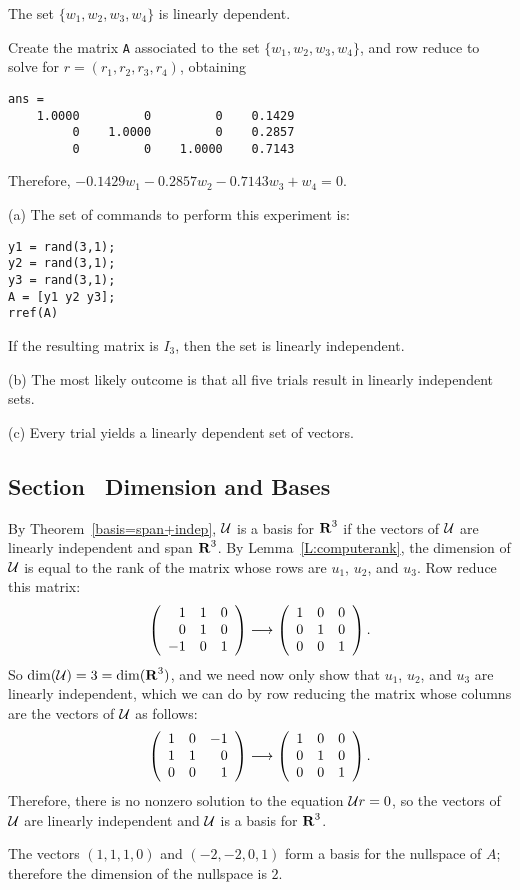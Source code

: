  \ans The set $\{w_1,w_2,w_3,w_4\}$ is linearly dependent.

\soln Create the matrix {\tt A} associated to the set
$\{w_1,w_2,w_3,w_4\}$, and row reduce to solve for
$r = (r_1,r_2,r_3,r_4)$, obtaining
\begin{verbatim}
ans =
    1.0000         0         0    0.1429
         0    1.0000         0    0.2857
         0         0    1.0000    0.7143
\end{verbatim}
Therefore, $-0.1429w_1 - 0.2857w_2 - 0.7143w_3 + w_4 = 0$.

(a) The set of commands to perform this experiment is:
\begin{verbatim}
y1 = rand(3,1);
y2 = rand(3,1);
y3 = rand(3,1);
A = [y1 y2 y3];
rref(A)
\end{verbatim}
If the resulting matrix is $I_3$, then the set is linearly
independent.

(b) The most likely outcome is that all five trials result in
linearly independent sets.

(c) Every trial yields a linearly dependent set of vectors.



\subsection*{Section~\protect{\ref{S:5.5}} Dimension and Bases}

By Theorem~\ref{basis=span+indep},
${\cal U}$ is a basis for $\mbox{$\bf{R}$}^3$ if the vectors of ${\cal U}$ are
linearly independent and span $\mbox{$\bf{R}$}^3$.  By Lemma~\ref{L:computerank},
the dimension of ${\cal U}$ is equal to the rank of the matrix whose
rows are $u_1$, $u_2$, and $u_3$.  Row reduce this matrix:
\[
\left(\begin{array}{rrr} 1 & 1 & 0 \\ 0 & 1 & 0 \\ -1 & 0 & 1\end{array}\right) \longrightarrow
\left(\begin{array}{rrr} 1 & 0 & 0 \\ 0 & 1 & 0 \\ 0 & 0 & 1\end{array}\right).
\]
So $\dim({\cal U}) = 3 = \dim(\mbox{$\bf{R}$}^3)$, and we need now only show that
$u_1$, $u_2$, and $u_3$ are linearly independent, which we can do by
row reducing the matrix whose columns are the vectors of ${\cal U}$ as
follows:
\[
\left(\begin{array}{rrr} 1 & 0 & -1 \\ 1 & 1 & 0 \\ 0 & 0 & 1\end{array}\right) \longrightarrow
\left(\begin{array}{rrr} 1 & 0 & 0 \\ 0 & 1 & 0 \\ 0 & 0 & 1\end{array}\right).
\]
Therefore, there is no nonzero solution to the equation
${\cal U}r = 0$, so the vectors of ${\cal U}$ are linearly independent
and ${\cal U}$ is a basis for $\mbox{$\bf{R}$}^3$.

\ans The vectors $(1,1,1,0)$ and $(-2,-2,0,1)$ form a basis for the
nullspace of $A$; therefore the dimension of the nullspace is $2$.

